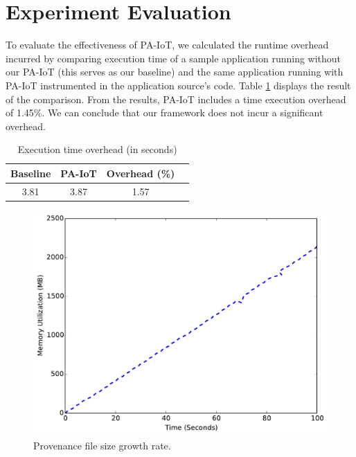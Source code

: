 \section{Experiment Evaluation}

To evaluate the effectiveness of PA-IoT, we calculated the runtime overhead incurred by comparing execution time of a sample application running without our PA-IoT (this serves as our baseline) and the same application running with PA-IoT instrumented in the application source's code. Table \ref{table:nonlin} displays the result of the comparison. From the results, PA-IoT includes a time execution overhead of 1.45\%. We can conclude that our framework does not incur a significant overhead.

\begin{table}[ht]
\caption{Execution time overhead (in seconds)} %
\centering %
\begin{tabular}{c c c c} %
\hline\hline %
Baseline & PA-IoT & Overhead (\%) \\ [0.5ex] %
\hline %
3.81 & 3.87 & 1.57 \\ %
 [1ex] %
\hline %
\end{tabular}
\label{table:nonlin} %
\end{table}

\begin{figure}[h!]
\begin{center}

\includegraphics[width=\textwidth]{result.pdf}    
\end{center}
\caption{Provenance file size growth rate.}
\label{prov_growth}
\end{figure}





